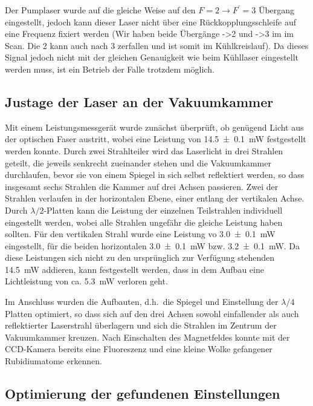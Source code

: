 \documentclass[11pt, a4paper]{article}
\numberwithin{equation}{section}
\newcommand{\korr}[1]{{\color{red}(#1)}}
\begin{document}
Der Pumplaser wurde auf die gleiche Weise auf den $F=2 \rightarrow F^\prime=3$ Übergang eingestellt, jedoch kann dieser Laser nicht über eine Rückkopplungsschleife auf eine Frequenz fixiert werden \korr{Wir haben beide Übergänge ->2 und ->3 im im Scan. Die 2 kann auch nach 3 zerfallen und ist somit im Kühlkreislauf}.
Da dieses Signal jedoch nicht mit der gleichen Genauigkeit wie beim Kühllaser eingestellt werden muss, ist ein Betrieb der Falle trotzdem möglich.

\subsection{Justage der Laser an der Vakuumkammer}

Mit einem Leistungsmessgerät wurde zunächst überprüft, ob genügend Licht aus der optischen Faser austritt, wobei eine Leistung von \SI{14,5 +- 0.1}{mW} festgestellt werden konnte.
Durch zwei Strahlteiler wird das Laserlicht in drei Strahlen geteilt, die jeweils senkrecht zueinander stehen und die Vakuumkammer durchlaufen, bevor sie von einem Spiegel in sich selbst reflektiert werden, so dass insgesamt sechs Strahlen die Kammer auf drei Achsen passieren.
Zwei der Strahlen verlaufen in der horizontalen Ebene, einer entlang der vertikalen Achse.
Durch $\lambda/2$-Platten kann die Leistung der einzelnen Teilstrahlen individuell eingestellt werden, wobei alle Strahlen ungefähr die gleiche Leistung haben sollten.
Für den vertikalen Strahl wurde eine Leistung vo \SI{3,0 +- 0.1}{mW} eingestellt, für die beiden horizontalen \SI{3,0 +- 0.1}{mW} bzw. \SI{3,2 +- 0.1}{mW}.
Da diese Leistungen sich nicht zu den ursprünglich zur Verfügung stehenden \SI{14,5}{mW} addieren, kann festgestellt werden, dass in dem Aufbau eine Lichtleistung von ca. \SI{5,3}{mW} verloren geht.

Im Anschluss wurden die Aufbauten, d.h.\ die Spiegel und Einstellung der $\lambda/4$ Platten optimiert, so dass sich auf den drei Achsen sowohl einfallender als auch reflektierter Laserstrahl überlagern und sich die Strahlen im Zentrum der Vakuumkammer kreuzen.
Nach Einschalten des Magnetfeldes konnte mit der CCD-Kamera bereits eine Fluoreszenz und eine kleine Wolke gefangener Rubidiumatome erkennen.

\subsection{Optimierung der gefundenen Einstellungen}
\end{document}
